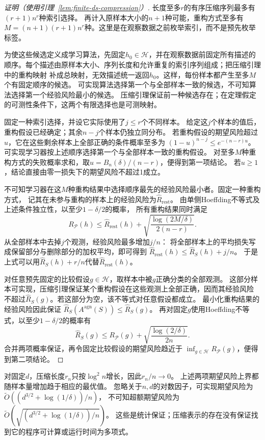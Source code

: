 \begin{proof}[证明（使用引理~\ref{lem:finite-ds-compression}）]
长度至多$r$的有序压缩序列最多有$(r+1)n^r$种索引选择。
再计入原样本大小的$n+1$种可能，重构方式至多有
$M=(n+1)(r+1)n^r$种。这里是在观察数据之前枚举索引，而不是预先枚举标签。

为使这些候选定义成学习算法，先固定$h_0\in\mathcal H$，并在观察数据前固定所有描述的
顺序。每个描述由原样本大小、序列长度和允许重复的索引序列组成；把压缩引理中的重构映射
补成总映射，无效描述统一返回$h_0$。这样，每份样本都产生至多$M$个有固定顺序的候选。
可实现算法选择第一个与全部样本一致的候选，不可知算法选择第一个经验风险最小的候选。
压缩引理保证前一种候选存在；在定理假定的可测性条件下，这两个有限选择也是可测映射。

固定一种索引选择，并设它实际使用了$j\leq r$个不同样本。
给定这$j$个样本的值后，重构假设已经确定；其余$n-j$个样本仍独立同分布。
若重构假设的期望风险超过$u$，它在这些剩余样本上全部正确的条件概率至多为
$(1-u)^{n-j}\leq e^{-(n-r)u}$。
可实现学习器按上述顺序选择第一个与全部样本一致的重构假设。
对至多$M$种重构方式的失败概率求和，取$u=B_n(\delta)/(n-r)$，便得到第一项结论。
若$u\geq1$，结论直接由零一损失下的期望风险不超过1成立。

不可知学习器在这$M$种重构结果中选择顺序最先的经验风险最小者。固定一种重构方式，
记其在未参与重构的样本上的经验风险为$\hat R_{\mathrm{rest}}$。
由单侧Hoeffding不等式及上述条件独立性，以至少$1-\delta/2$的概率，
所有重构结果同时满足
\[
 R_{\mathcal P}(h)\leq\hat R_{\mathrm{rest}}(h)
       +\sqrt{\frac{\log(2M/\delta)}{2(n-r)}}.
\]
从全部样本中去掉$j$个观测，经验风险最多增加$j/n$：
将全部样本上的平均损失写成保留部分与删除部分的加权平均，即可得到
$\hat R_{\mathrm{rest}}(h)\leq\hat R_S(h)+j/n$。
于是上式可以用$\hat R_S(h)+r/n$代替$\hat R_{\mathrm{rest}}(h)$。

对任意预先固定的比较假设$g\in\mathcal H$，取样本中被$g$正确分类的全部观测。
这部分样本可实现，压缩引理保证某个重构假设在这些观测上全部正确，因而其经验风险
不超过$\hat R_S(g)$。若这部分为空，该不等式对任意假设都成立。
最小化重构结果的经验风险因此保证
$\hat R_S(A^{\mathrm{agn}}(S))\leq\hat R_S(g)$。
再对固定$g$使用Hoeffding不等式，以至少$1-\delta/2$的概率有
\[
 \hat R_S(g)\leq R_{\mathcal P}(g)
       +\sqrt{\frac{\log(2/\delta)}{2n}}.
\]
合并两项概率保证，再令固定比较假设的期望风险趋近于
$\inf_{g\in\mathcal H}R_{\mathcal P}(g)$，便得到第二项结论。
\end{proof}

对固定$d$，压缩长度$r_n$只按$\log^2 n$增长，因此$r_n/n\to0$。
上述两项期望风险上界都随样本量增加趋于相应的最优值。
忽略关于$n,d$的对数因子，可实现期望风险为
$\widetilde O((d^{3/2}+\log(1/\delta))/n)$，
不可知超额期望风险为
$\widetilde O(\sqrt{(d^{3/2}+\log(1/\delta))/n})$。
这些是统计保证；压缩表示的存在没有保证找到它的程序可计算或运行时间为多项式。

